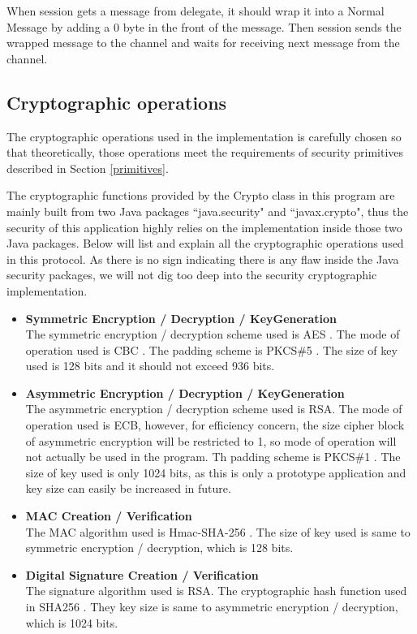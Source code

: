 When session gets a message from delegate, it should wrap it into a Normal Message by adding a 0 byte in the front of the message. Then session sends the wrapped message to the channel and waits for receiving next message from the channel.

\subsection{Cryptographic operations}
The cryptographic operations used in the implementation is carefully chosen so that theoretically, those operations meet the requirements of security primitives described in Section \ref{primitives}. 

The cryptographic functions provided by the Crypto class in this program are mainly built from two Java packages ``java.security" and ``javax.crypto", thus the security of this application highly relies on the implementation inside those two Java packages. Below will list and explain all the cryptographic operations used in this protocol. As there is no sign indicating there is any flaw inside the Java security packages, we will not dig too deep into the security cryptographic implementation. 

\begin{itemize}
\item \textbf{Symmetric Encryption / Decryption / KeyGeneration} \\
The symmetric encryption / decryption scheme used is AES \cite{Miller}. The mode of operation used is CBC \cite{ehrsam1978message}. The padding scheme is PKCS\#5 \cite{RFC2898}. The size of key used is 128 bits and it should not exceed 936 bits.

\item \textbf{Asymmetric Encryption / Decryption / KeyGeneration} \\
The asymmetric encryption / decryption scheme used is RSA. The mode of operation used is ECB, however, for efficiency concern, the size cipher block of asymmetric encryption will be restricted to 1, so mode of operation will not actually be used in the program. Th padding scheme is PKCS\#1 \cite{RFC2313}. The size of key used is only 1024 bits, as this is only a prototype application and key size can easily be increased in future.

\item \textbf{MAC Creation / Verification} \\
The MAC algorithm used is Hmac-SHA-256 \cite{RFC6234}. The size of key used is same to symmetric encryption / decryption, which is 128 bits.

\item \textbf{Digital Signature Creation / Verification} \\
The signature algorithm used is RSA. The cryptographic hash function used in SHA256 \cite{RFC6234}. They key size is same to asymmetric encryption / decryption, which is 1024 bits.
\end{itemize}

